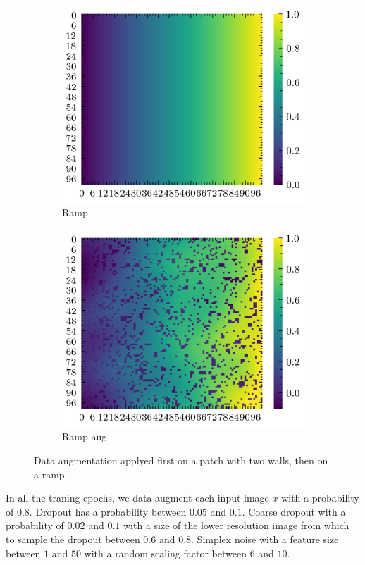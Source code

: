 \documentclass[../document.tex]{subfiles}
\begin{document}
\begin{figure}[H]
\begin{subfigure}[b]{0.23\textwidth}
            \includegraphics[width=\textwidth]{../img/data-aug/2d/ramp.png}
            \caption{Ramp}
        \end{subfigure}
        \begin{subfigure}[b]{0.23\linewidth}
            \includegraphics[width=\textwidth]{../img/data-aug/2d/ramp-aug.png}
            \caption{Ramp aug}
        \end{subfigure}    
    \label{fig: others-aug}
    \caption{Data augmentation applyed first on a patch with two walls, then on a ramp.}    
\end{figure}
In all the traning epochs, we data augment each input image $x$ with a probability of $0.8$. Dropout has a probability between $0.05$ and $0.1$. Coarse dropout with a probability of $0.02$ and $0.1$ with a size of the lower resolution image from which to sample the dropout between $0.6$ and $0.8$. Simplex noise with a feature size between $1$ and $50$ with a random scaling factor between $6$ and $10$. 
\end{document}
